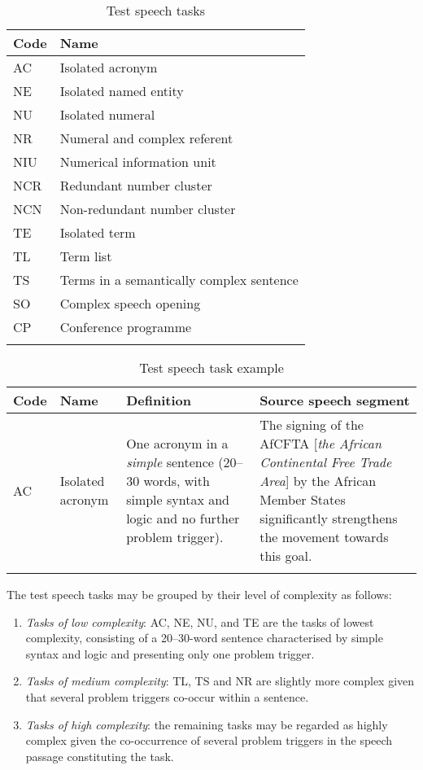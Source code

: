 \begin{table}[p]
\begin{tabular}{ll}
\lsptoprule
Code & Name\\\midrule
AC        & Isolated acronym                         \\
NE        & Isolated   named entity                  \\
NU        & Isolated   numeral                       \\
NR        & Numeral and   complex referent           \\
NIU       & Numerical   information unit             \\
NCR       & Redundant   number cluster               \\
NCN       & Non-redundant   number cluster           \\
TE        & Isolated   term                          \\
TL        & Term list                                \\
TS        & Terms in a semantically complex sentence \\
SO        & Complex   speech opening                 \\
CP        & Conference   programme                   \\
\lspbottomrule
\end{tabular}
\caption{Test speech tasks\label{tab:3}}
\end{table}

\begin{table}[p]
\begin{tabularx}{\textwidth}{llQQ}
\lsptoprule
Code & Name    & Definition & Source speech segment\\ \midrule
AC   & Isolated acronym & One acronym in a \textit{simple} sentence (20--30 words, with simple syntax and logic and no further problem trigger). & The signing of the AfCFTA {[}\textit{the African Continental Free Trade} \textit{Area}{]} by the African Member States significantly strengthens the movement towards this goal.\\
\lspbottomrule
\end{tabularx}
\caption{Test speech task example\label{tab:4}}
\end{table}

The test speech tasks may be grouped by their level of complexity as follows:

\begin{enumerate}
    \item \textit{Tasks of low complexity}: AC, NE, NU, and TE are the tasks of lowest complexity, consisting of a 20–30-word sentence characterised by simple syntax and logic and presenting only one problem trigger.
    \item \textit{Tasks of medium complexity}: TL, TS and NR are slightly more complex given that several problem triggers co-occur within a sentence.
    \item \textit{Tasks of high complexity}: the remaining tasks may be regarded as highly complex given the co-occurrence of several problem triggers in the speech passage constituting the task.
\end{enumerate}

